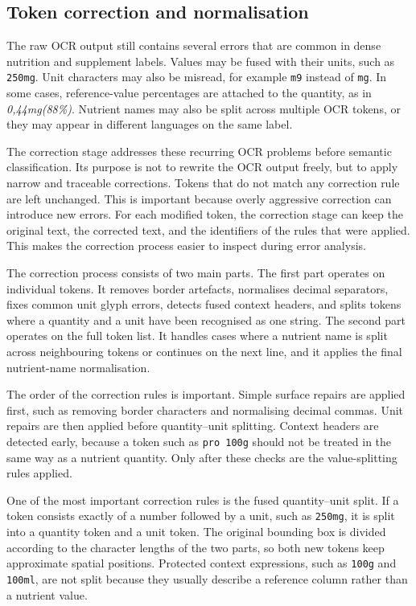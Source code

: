 \subsection{Token correction and normalisation}\label{sec:ocr-correction}

The raw OCR output still contains several errors that are common in dense nutrition and supplement labels. Values may be fused with their units, such as \texttt{250mg}. Unit characters may also be misread, for example \texttt{m9} instead of \texttt{mg}. In some cases, reference-value percentages are attached to the quantity, as in \emph{0,44mg(88\%)}. Nutrient names may also be split across multiple OCR tokens, or they may appear in different languages on the same label.

The correction stage addresses these recurring OCR problems before semantic classification. Its purpose is not to rewrite the OCR output freely, but to apply narrow and traceable corrections. Tokens that do not match any correction rule are left unchanged. This is important because overly aggressive correction can introduce new errors. For each modified token, the correction stage can keep the original text, the corrected text, and the identifiers of the rules that were applied. This makes the correction process easier to inspect during error analysis.

The correction process consists of two main parts. The first part operates on individual tokens. It removes border artefacts, normalises decimal separators, fixes common unit glyph errors, detects fused context headers, and splits tokens where a quantity and a unit have been recognised as one string. The second part operates on the full token list. It handles cases where a nutrient name is split across neighbouring tokens or continues on the next line, and it applies the final nutrient-name normalisation.

The order of the correction rules is important. Simple surface repairs are applied first, such as removing border characters and normalising decimal commas. Unit repairs are then applied before quantity--unit splitting. Context headers are detected early, because a token such as \texttt{pro 100g} should not be treated in the same way as a nutrient quantity. Only after these checks are the value-splitting rules applied.

One of the most important correction rules is the fused quantity--unit split. If a token consists exactly of a number followed by a unit, such as \texttt{250mg}, it is split into a quantity token and a unit token. The original bounding box is divided according to the character lengths of the two parts, so both new tokens keep approximate spatial positions. Protected context expressions, such as \texttt{100g} and \texttt{100ml}, are not split because they usually describe a reference column rather than a nutrient value.

